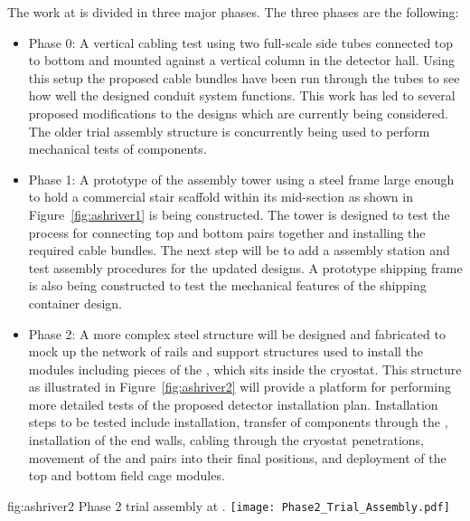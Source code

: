 The work at  is divided in three major phases.
The three phases are the following:
\begin{itemize}
  \item {Phase 0:} A vertical cabling test using two full-scale 
          side tubes connected top to bottom and mounted 
         against a vertical column in the detector hall.  Using this 
         setup the proposed cable bundles have been run through the 
         tubes to see how well the designed conduit system functions.
         This work has led to several proposed modifications to the 
         designs which are currently being considered.  The older 
          trial assembly structure is concurrently 
         being used to perform mechanical tests of  
         components. 
  \item {Phase 1:} A prototype of the   
         assembly tower using a steel frame large enough to hold a 
         commercial stair scaffold within its mid-section as shown 
         in Figure~\ref{fig:ashriver1} is being constructed.  The 
         tower is designed to test the process for connecting top 
         and bottom  pairs together and installing the 
         required cable bundles.  The next step will be to add a
          assembly station and test assembly procedures 
         for the updated  designs.  A prototype 
          shipping frame is also being constructed to 
         test the mechanical features of the shipping container 
         design.  
  \item {Phase 2:} A more complex steel structure will be 
         designed and fabricated to mock up the network of rails 
         and support structures used to install the 
          modules including pieces of the , 
         which sits inside the cryostat.  This structure as 
         illustrated in Figure~\ref{fig:ashriver2} will provide 
         a platform for performing more detailed tests of the 
         proposed detector installation plan.  Installation steps 
         to be tested include  installation, transfer 
         of  components through the , 
         installation of the  end walls, cabling 
         through the cryostat penetrations, movement of the 
          and   pairs into their final 
         positions, and deployment of the top and bottom field 
         cage modules.
\end{itemize}
\begin{dunefigure}{fig:ashriver2}
  {Phase 2 trial assembly at .}
  \texttt{[image: Phase2\_Trial\_Assembly.pdf]}
\end{dunefigure}

